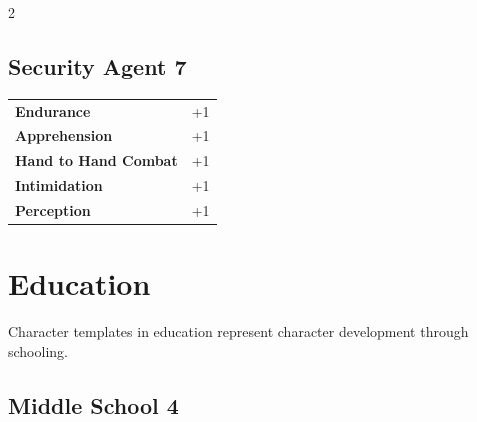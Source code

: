 \begin{multicols}{2}
\begin{tcolorbox}

\end{tcolorbox}

\begin{tcolorbox}
    \subsection*{Security Agent \hfill \small{7 }}
    \tcblower




\begin{tabular}{@{}ll@{}}
    \textbf{Endurance} & +1\\
    \textbf{Apprehension} & +1\\
    \textbf{Hand to Hand Combat} & +1\\
    \textbf{Intimidation} & +1\\
    \textbf{Perception} & +1\\
\end{tabular}


\end{tcolorbox}

\section{Education}

Character templates in education represent character development through schooling.

\begin{tcolorbox}
    \subsection*{Middle School \hfill \small{4 }}
    \tcblower





\end{tcolorbox}
\end{multicols}
